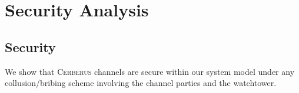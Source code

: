 \documentclass[twocolumn,showpacs,%
  nofootinbib,aps,superscriptaddress,%
  eqsecnum,prd,notitlepage,showkeys,10pt]{revtex4-1}
\newcommand{\sys}{\textsc{Cerberus}\xspace}
\begin{document}



\section{Security Analysis}

\subsection{Security}
We show that \sys channels are secure within our system model under any collusion/bribing scheme involving the channel parties and the watchtower.
\end{document}

